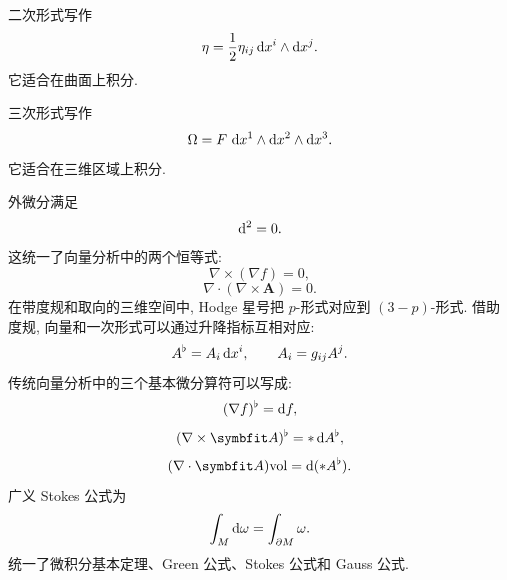 二次形式写作
\[
\eta=\frac{1}{2}\eta_{ij}\mathop{}\!\mathrm{d} x^i\wedge \mathop{}\!\mathrm{d} x^j.
\]
它适合在曲面上积分. 

三次形式写作
\[
\Omega=F\,\mathop{}\!\mathrm{d} x^1\wedge \mathop{}\!\mathrm{d} x^2\wedge \mathop{}\!\mathrm{d} x^3.
\]
它适合在三维区域上积分. 

外微分满足
\[
\mathop{}\!\mathrm{d}^{2}=0.
\]
这统一了向量分析中的两个恒等式: 
\[
\nabla\times(\nabla f)=0,
\]
\[
\nabla\cdot(\nabla\times\bm{A})=0.
\]
在带度规和取向的三维空间中, Hodge 星号把 $p$-形式对应到 $(3-p)$-形式. 借助度规, 向量和一次形式可以通过升降指标互相对应: 
\[
A^\flat=A_i \mathop{}\!\mathrm{d} x^i,
\qquad
A_i=g_{ij}A^j.
\]
传统向量分析中的三个基本微分算符可以写成: 
\[
(\nabla f)^\flat=\mathop{}\!\mathrm{d} f,
\]
\[
(\nabla\times\bm{A})^\flat=*\dif A^\flat,
\]
\[
(\nabla\cdot\bm{A})\mathrm{vol}=\dif(*A^\flat).
\]
广义 Stokes 公式为
\[
\int_M \mathop{}\!\mathrm{d}\omega
=
\int_{\partial M}\omega.
\]
统一了微积分基本定理、Green 公式、Stokes 公式和 Gauss 公式. 